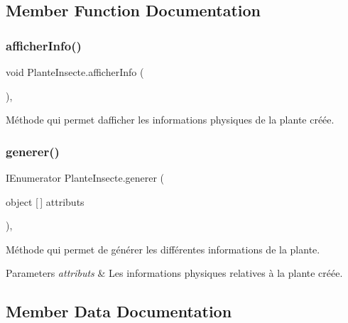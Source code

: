 \subsection{Member Function Documentation}
\mbox{\label{class_plante_insecte_aa9bdc4d5d44328a744969f5be851a5f5}} 
\subsubsection{\texorpdfstring{afficher\+Info()}{afficherInfo()}}
{\footnotesize\ttfamily void Plante\+Insecte.\+afficher\+Info (\begin{DoxyParamCaption}{ }\end{DoxyParamCaption})\hspace{0.3cm}{\ttfamily [inline]}, {\ttfamily [private]}}

Méthode qui permet d\textquotesingle{}afficher les informations physiques de la plante créée. \mbox{\label{class_plante_insecte_a9c634b8de63b9d9451af19fa7df2c5b4}} 
\subsubsection{\texorpdfstring{generer()}{generer()}}
{\footnotesize\ttfamily I\+Enumerator Plante\+Insecte.\+generer (\begin{DoxyParamCaption}\item[{object \mbox{[}$\,$\mbox{]}}]{attributs }\end{DoxyParamCaption})\hspace{0.3cm}{\ttfamily [inline]}, {\ttfamily [private]}}

Méthode qui permet de générer les différentes informations de la plante. 
\begin{DoxyParams}{Parameters}
{\em attributs} & Les informations physiques relatives à la plante créée. \\
\hline
\end{DoxyParams}


\subsection{Member Data Documentation}
\mbox{\label{class_plante_insecte_a2a6a82e57f74cbe86c5bcd5ab34a5078}} 
